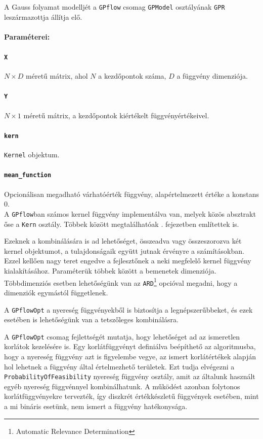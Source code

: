 A Gauss folyamat modelljét a \texttt{GPflow} csomag \texttt{GPModel} osztályának \texttt{GPR} leszármazottja állítja elő.
\paragraph{Paraméterei:}
\paragraph{\texttt{X}} $N\times D$ méretű mátrix, ahol $N$ a kezdőpontok száma, $D$ a függvény dimenziója.
\paragraph{\texttt{Y}} $N\times 1$ méretű mátrix, a kezdőpontok kiértékelt függvényértékeivel.
\paragraph{\texttt{kern}} \texttt{Kernel} objektum.
\paragraph{\texttt{mean\_function}} Opcionálisan megadható várhatóérték függvény, alapértelmezett értéke a konstans 0.\\

A \texttt{GPflow}ban számos kernel függvény implementálva van, melyek közös absztrakt őse a \texttt{Kern} osztály. Többek között megtalálhatóak . fejezetben említettek is.

Ezeknek a kombinálására is ad lehetőséget, összeadva vagy összeszorozva két kernel objektumot, a tulajdonságaik együtt jutnak érvényre a számításokban. Ezzel kellően nagy teret engedve a fejlesztőnek a neki megfelelő kernel függvény kialakításához. Paraméterük többek között a bemenetek dimenziója. Többdimenziós esetben lehetőségünk van az \texttt{ARD}\footnote{Automatic Relevance Determination} opcióval megadni, hogy a dimenziók egymástól függetlenek.

A \texttt{GPflowOpt} a nyereség függvényekből is biztosítja a legnépszerűbbeket, és ezek esetében is lehetőségünk van a tetszőleges kombinálásra.

A \texttt{GPflowOpt} csomag fejlettségét mutatja, hogy lehetőséget ad az ismeretlen korlátok kezelésére is. Egy korlátfüggvényt definiálva beépíthető az algoritmusba, hogy a nyereség függvény azt is figyelembe vegye, az ismert korlátértékek alapján hol lehetnek a függvény által értelmezhető területek. Ezt tudja elvégezni a \texttt{ProbabilityOfFeasibility} nyereség függvény osztály, amit az általunk használt egyéb nyereség függvénnyel kombinálhatunk. A működést azonban folytonos korlátfüggvényekre tervezték, így diszkrét értékkészletű függvények esetében, mint a mi bináris esetünk, nem ismert a függvény hatékonysága.

